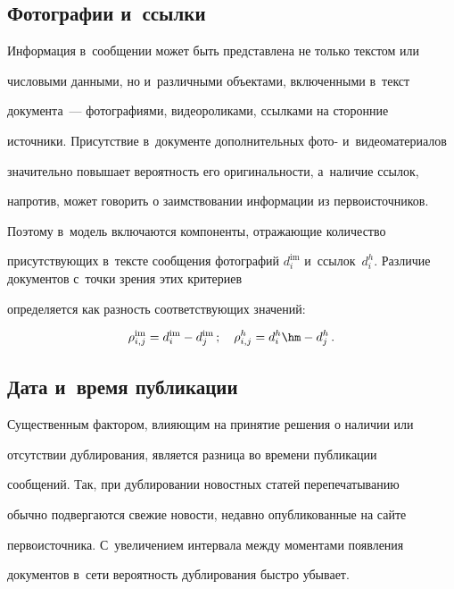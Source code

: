 \subsection{Фотографии и~ссылки}



  Информация в~сообщении может быть представлена не только текстом или

числовыми данными, но и~различными объектами, включенными в~текст

документа~--- фотографиями, видеороликами, ссылками на сторонние

источники. Присутствие в~документе дополнительных фото- и~видеоматериалов

значительно повышает вероятность его оригинальности, а~наличие ссылок,

напротив, может говорить о заимствовании информации из первоисточников.

%

  Поэтому в~модель включаются компоненты, отражающие количество

присутствующих в~тексте сообщения фотографий $d_i^{\mathrm{im}}$ и~ссылок~$d_i^h$. Различие документов с~точки зрения этих критериев

определяется как разность соответствующих значений:

$$

\rho_{i,j}^{\mathrm{im}}= d_i^{\mathrm{im}}- d_j^{\mathrm{im}}\,;\quad

\rho_{i,j}^h= d_i^h\hm- d_j^h\,.

$$



\subsection{Дата и~время публикации}



  Существенным фактором, влияющим на принятие решения о наличии или

отсутствии дублирования, является разница во времени публикации

сообщений. Так, при дублировании новостных статей перепечатыванию

обычно подвергаются свежие новости, недавно опубликованные на сайте

первоисточника. С~увеличением интервала между моментами появления

документов в~сети вероятность дублирования быстро убывает.



